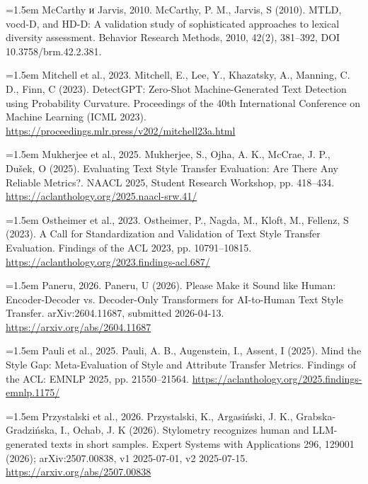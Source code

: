 \documentclass[11pt,a4paper]{article}
\renewcommand{\_}{\textunderscore\allowbreak}
\begin{document}
\noindent\hangindent=1.5em McCarthy и Jarvis, 2010. McCarthy, P. M., Jarvis, S (2010). MTLD, vocd-D, and HD-D: A validation study of sophisticated approaches to lexical diversity assessment. Behavior Research Methods, 2010, 42(2), 381–392, DOI 10.3758/brm.42.2.381.\par\smallskip

\noindent\hangindent=1.5em Mitchell et al., 2023. Mitchell, E., Lee, Y., Khazatsky, A., Manning, C. D., Finn, C (2023). DetectGPT: Zero-Shot Machine-Generated Text Detection using Probability Curvature. Proceedings of the 40th International Conference on Machine Learning (ICML 2023). \url{https://proceedings.mlr.press/v202/mitchell23a.html}\par\smallskip

\noindent\hangindent=1.5em Mukherjee et al., 2025. Mukherjee, S., Ojha, A. K., McCrae, J. P., Du\v{s}ek, O (2025). Evaluating Text Style Transfer Evaluation: Are There Any Reliable Metrics?. NAACL 2025, Student Research Workshop, pp. 418–434. \url{https://aclanthology.org/2025.naacl-srw.41/}\par\smallskip

\noindent\hangindent=1.5em Ostheimer et al., 2023. Ostheimer, P., Nagda, M., Kloft, M., Fellenz, S (2023). A Call for Standardization and Validation of Text Style Transfer Evaluation. Findings of the ACL 2023, pp. 10791–10815. \url{https://aclanthology.org/2023.findings-acl.687/}\par\smallskip

\noindent\hangindent=1.5em Paneru, 2026. Paneru, U (2026). Please Make it Sound like Human: Encoder-Decoder vs. Decoder-Only Transformers for AI-to-Human Text Style Transfer. arXiv:2604.11687, submitted 2026-04-13. \url{https://arxiv.org/abs/2604.11687}\par\smallskip

\noindent\hangindent=1.5em Pauli et al., 2025. Pauli, A. B., Augenstein, I., Assent, I (2025). Mind the Style Gap: Meta-Evaluation of Style and Attribute Transfer Metrics. Findings of the ACL: EMNLP 2025, pp. 21550–21564. \url{https://aclanthology.org/2025.findings-emnlp.1175/}\par\smallskip

\noindent\hangindent=1.5em Przystalski et al., 2026. Przystalski, K., Argasi\'nski, J. K., Grabska-Gradzi\'nska, I., Ochab, J. K (2026). Stylometry recognizes human and LLM-generated texts in short samples. Expert Systems with Applications 296, 129001 (2026); arXiv:2507.00838, v1 2025-07-01, v2 2025-07-15. \url{https://arxiv.org/abs/2507.00838}\par\smallskip
\end{document}
